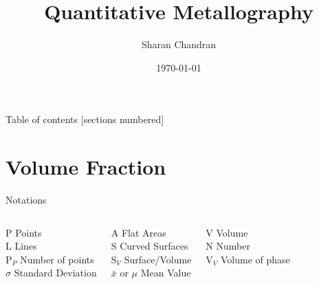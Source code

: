\documentclass[10pt]{beamer}
\title{Quantitative Metallography}
\date{\today}
\author{Sharan Chandran}
\institute{Indian Institute of Science}
\begin{document}
\graphicspath{{../Images/}} 

\maketitle


\begin{frame}{Table of contents}
  [sections numbered]
  \tableofcontents[hideallsubsections]
\end{frame}

\section{Volume Fraction}

\begin{frame}{Notations}


  \begin{columns}[T,onlytextwidth]
    P Points \\
    L Lines  \\
    P$ _{P} $ Number of points \\
    $\sigma$ Standard Deviation
 
   A Flat Areas \\
   S Curved Surfaces \\
   S$ _{V} $ Surface/Volume \\
   $\bar{x}$ or $\mu$ Mean Value
  
    V Volume \\
    N Number \\
    V$ _{V} $ Volume of phase
\end{columns}     

\end{frame}
\end{document}

